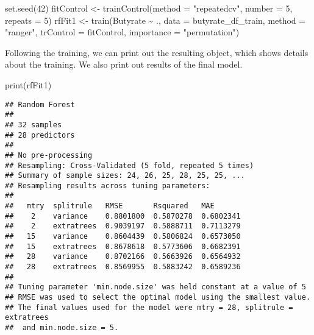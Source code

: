 \documentclass[
  oneside]{book}
\newenvironment{Shaded}{\begin{snugshade}}{\end{snugshade}}
\newcommand{\AttributeTok}[1]{\textcolor[rgb]{0.77,0.63,0.00}{#1}}
\newcommand{\DecValTok}[1]{\textcolor[rgb]{0.00,0.00,0.81}{#1}}
\newcommand{\FunctionTok}[1]{\textcolor[rgb]{0.00,0.00,0.00}{#1}}
\newcommand{\NormalTok}[1]{#1}
\newcommand{\OtherTok}[1]{\textcolor[rgb]{0.56,0.35,0.01}{#1}}
\newcommand{\SpecialCharTok}[1]{\textcolor[rgb]{0.00,0.00,0.00}{#1}}
\newcommand{\StringTok}[1]{\textcolor[rgb]{0.31,0.60,0.02}{#1}}
\begin{document}
\begin{Shaded}
\begin{Highlighting}[]
\FunctionTok{set.seed}\NormalTok{(}\DecValTok{42}\NormalTok{)}
\NormalTok{fitControl }\OtherTok{\textless{}{-}} \FunctionTok{trainControl}\NormalTok{(}\AttributeTok{method =} \StringTok{"repeatedcv"}\NormalTok{, }\AttributeTok{number =} \DecValTok{5}\NormalTok{, }\AttributeTok{repeats =} \DecValTok{5}\NormalTok{)}
\NormalTok{rfFit1 }\OtherTok{\textless{}{-}} \FunctionTok{train}\NormalTok{(Butyrate }\SpecialCharTok{\textasciitilde{}}\NormalTok{ ., }\AttributeTok{data =}\NormalTok{ butyrate\_df\_train, }
                \AttributeTok{method =} \StringTok{"ranger"}\NormalTok{, }
                \AttributeTok{trControl =}\NormalTok{ fitControl,}
                \AttributeTok{importance =} \StringTok{"permutation"}\NormalTok{)}
\end{Highlighting}
\end{Shaded}

Following the training, we can print out the resulting object, which shows details about
the training. We also print out results of the final model.

\begin{Shaded}
\begin{Highlighting}[]
\FunctionTok{print}\NormalTok{(rfFit1)}
\end{Highlighting}
\end{Shaded}

\begin{verbatim}
## Random Forest 
## 
## 32 samples
## 28 predictors
## 
## No pre-processing
## Resampling: Cross-Validated (5 fold, repeated 5 times) 
## Summary of sample sizes: 24, 26, 25, 28, 25, 25, ... 
## Resampling results across tuning parameters:
## 
##   mtry  splitrule   RMSE       Rsquared   MAE      
##    2    variance    0.8801800  0.5870278  0.6802341
##    2    extratrees  0.9039197  0.5888711  0.7113279
##   15    variance    0.8604439  0.5806824  0.6573050
##   15    extratrees  0.8678618  0.5773606  0.6682391
##   28    variance    0.8702166  0.5663926  0.6564932
##   28    extratrees  0.8569955  0.5883242  0.6589236
## 
## Tuning parameter 'min.node.size' was held constant at a value of 5
## RMSE was used to select the optimal model using the smallest value.
## The final values used for the model were mtry = 28, splitrule = extratrees
##  and min.node.size = 5.
\end{verbatim}

\begin{Shaded}
\end{Shaded}
\end{document}
